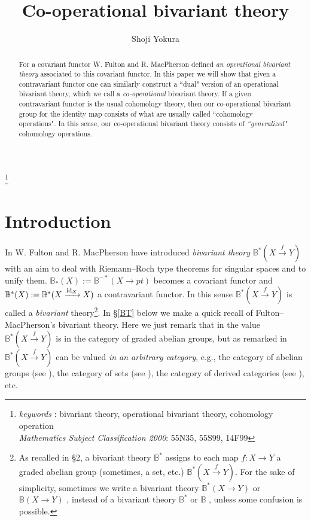 \documentclass[a4paper]{amsart}
\begin{document}
\title{Co-operational bivariant theory
}

\thanks {
\noindent
\emph{keywords} : bivariant theory, operational bivariant theory, cohomology operation \\
\emph{Mathematics Subject Classification 2000}: 55N35, 55S99, 14F99}

\author{Shoji Yokura}

\date{}
\address{Graduate School of Science and Engineering, Kagoshima University, 1-21-35 Korimoto, Kagoshima, 890-0065, Japan}

\begin{abstract}
For a covariant functor 
W. Fulton and R. MacPherson defined \emph{an operational bivariant theory} associated to this covariant functor. In this paper we will show that given a contravariant functor 
one can similarly construct a ``dual" version of an operational bivariant theory, which we call a \emph{co-operational} bivariant theory. 
If a given contravariant functor is the usual cohomology theory, then our co-operational bivariant group 
for the identity map consists of what are usually called ``cohomology operations". In this sense, our co-operational bivariant theory consists of \emph{``generalized"} cohomology operations.
\end{abstract}

\maketitle


\section{Introduction}
In \cite{FM} W. Fulton and R. MacPherson have introduced \emph{bivariant theory} $\mathbb B^*(X \xrightarrow f Y)$  with an aim to deal with Riemann--Roch type theorems for singular spaces and to unify them. $\mathbb B_*(X):= \mathbb B^{-*}(X \xrightarrow {} pt)$ becomes a covariant functor and $\mathbb B^*(X):= \mathbb B^{*}(X \xrightarrow {\operatorname{id}_X} X)$  
 a contravariant functor. In this sense  $\mathbb B^*(X \xrightarrow f Y)$ is called a \emph{bivariant} theory\footnote{As recalled in \S 2, a bivariant theory $\mathbb B^*$ assigns to each map $f:X \to Y$ a graded abelian group (sometimes, a set, etc.) $\mathbb B^*(X \xrightarrow f Y)$. For the sake of simplicity, sometimes we write a bivariant theory $\mathbb B^*(X \to Y)$ or $\mathbb B(X \to Y)$ , instead of a bivariant theory $\mathbb B^*$ or $\mathbb B$  , unless some confusion is possible.}. 
In \S \ref{BT} below we make a quick recall of Fulton--MacPherson's bivariant theory. Here we just remark that in \cite[\S 2.2 Axioms for a bivariant theory]{FM} the value $\mathbb B^*(X \xrightarrow f Y)$ is in the category of graded abelian groups, but as remarked in \cite[Remark, p.22]{FM} $\mathbb B^*(X \xrightarrow f Y)$ can be valued \emph{in an arbitrary category}, e.g., the category of abelian groups (see \cite[\S 6.1.2 Definition of $\mathbb F$, p.60]{FM}), the category of sets (see \cite[\S 4.3 Differentiable Riemann--Roch]{FM}), the category of derived categories (see \cite[\S 7 Grothendieck Duality and Derived Functors]{FM}), etc.
 
\end{document}
